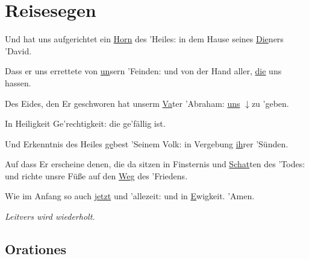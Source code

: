\chapter{Reisesegen}\def\gebet{\textsc{Reisesegen}}
\par
\begin{multicols}{2}\setlength{\columnseprule}{0.2pt}
Und hat uns aufgerichtet ein \underline{Horn} des 'Heiles: \grestar{} in dem Hause seines \underline{Die}ners 'David.\par
{}
Dass er uns errettete von \underline{un}sern 'Feinden: \grestar{} und von der Hand aller, \underline{die} uns hassen.\par
{}
Des Eides, den Er geschworen hat unserm \underline{Va}ter 'Abraham: \grestar{} \underline{uns} {\tiny$\downarrow$}zu 'geben.\par
{}
In Heiligkeit  Ge'rechtigkeit: \grestar{} die  ge'fällig ist.\par
{}
Und Erkenntnis des Heiles \underline{ge}best 'Seinem Volk: \grestar{} in Vergebung \underline{ih}rer 'Sünden.\par
{}
Auf dass Er erscheine denen, die da sitzen in Finsternis und \underline{Schat}ten des 'Todes: \grestar{} und richte unsre Füße auf den \underline{Weg} des 'Friedens.\par
{}
Wie im Anfang so auch \underline{jetzt} und 'allezeit: \grestar{} und in \underline{E}wigkeit. 'Amen.\par
 \textit{Leitvers wird wiederholt.}
\end{multicols}
\newpage
\section*{Orationes}

